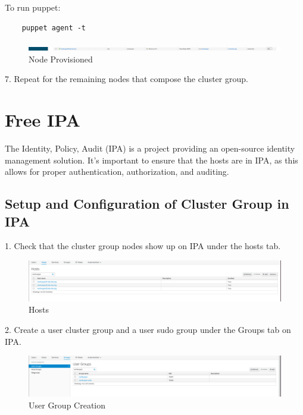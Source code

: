 To run puppet:

\begin{center}
\begin{verbatim}
    puppet agent -t
\end{verbatim}
\end{center}

\begin{figure}
    \includegraphics[width=12cm]{Images/Image16.png}
    \centering
    \caption{Node Provisioned}
\end{figure}

7. Repeat for the remaining nodes that compose the cluster group.

\vfill\eject

\section{Free IPA}
The Identity, Policy, Audit (IPA) is a project providing an open-source identity management solution. It's important to ensure that the hosts are in IPA, as this allows for proper authentication, authorization, and auditing.

\subsection {Setup and Configuration of Cluster Group in IPA}

1. Check that the cluster group nodes show up on IPA under the hosts tab.

\begin{figure}
    \includegraphics[width=12cm]{Images/Image17.png}
    \centering
    \caption{Hosts}
\end{figure}

2. Create a user cluster group and a user sudo group under the Groups tab on IPA.

\begin{figure}
    \includegraphics[width=12cm]{Images/Image19.png}
    \centering
    \caption{User Group Creation}
\end{figure}

